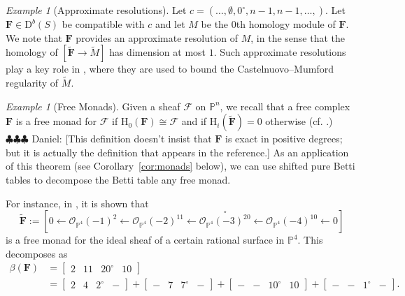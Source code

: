 \documentclass[12pt]{amsart}
\theoremstyle{definition}
\theoremstyle{remark}
\newtheorem{example}[lemma]{Example}
\newcommand{\PP}{\mathbb{P}}
\newcommand{\HH}{\mathrm{H}}
\newcommand{\cc}{c}
\newcommand{\cO}{\mathcal{O}}
\newcommand{\cF}{\mathcal{F}}
\newcommand{\FF}{\mathbf{F}}
\newcommand{\defi}[1]{\textsf{#1}} %
\newcommand{\zp}{\circ}
\newcommand{\nothing}{\emptyset}
\newcommand{\DD}{\mathrm{D}}
\newcommand{\daniel}[1]{{\color{green} \sf $\clubsuit\clubsuit\clubsuit$ Daniel: [#1]}}
\begin{document}
\begin{example}[Approximate resolutions]
Let $\cc=(\dots,\nothing,0^\zp,n-1,n-1,\dots,)$.   Let $\FF\in \DD^b(S)$ be compatible with $\cc$ and let $M$ be the $0$th homology module of $\FF$.  We note that $\FF$ provides an approximate resolution of $M$, in the sense that the homology of $[\widetilde{\FF}\to \widetilde{M}]$ has dimension at most $1$.  Such approximate resolutions play a key role in \cite[Lemma~1.6]{gruson-lazarsfeld-peskine}, where they are used to bound the Castelnuovo--Mumford regularity of $\widetilde{M}$.
\end{example}

\begin{example}[Free Monads]\label{ex:monads}
Given a sheaf $\cF$ on $\PP^n$, we recall that a free complex $\FF$ is a \defi{free monad} for $\cF$ if $\HH_0(\FF)\cong \cF$ and if $\HH_i(\widetilde{\FF})=0$ otherwise (cf. \cite[\S8]{eis-floy-schrey}.) \daniel{This definition doesn't insist that $\FF$ is exact in positive degrees; but it is actually the definition that appears in the reference.}  As an application of this theorem (see Corollary~\ref{cor:monads} below), we can use shifted pure Betti tables to decompose the Betti table any free monad.  

For instance, in \cite[Example 8.2]{eis-floy-schrey}, it is shown that
\[
\widetilde{\FF}:=\left[0\gets \cO_{\PP^4}(-1)^2 \gets  \cO_{\PP^4}(-2)^{11}\gets \overset{\zp}{\cO_{\PP^4}(-3)^{20}}\gets \cO_{\PP^4}(-4)^{10}\gets 0 \right]
\]
is a free monad for the ideal sheaf of a certain rational surface in $\PP^4$.  This decomposes as
\begin{align*}
\beta(\FF)&=
\begin{bmatrix}
2&11&20^\zp&10
\end{bmatrix}
\\
&=
\begin{bmatrix}
2&4&2^\zp&-
\end{bmatrix}
+
\begin{bmatrix}
-&7&7^\zp&-
\end{bmatrix}
+
\begin{bmatrix}
-&-&10^\zp&10
\end{bmatrix}
+
\begin{bmatrix}
-&-&1^\zp&-
\end{bmatrix}.
\end{align*}
\end{example}
\end{document}
